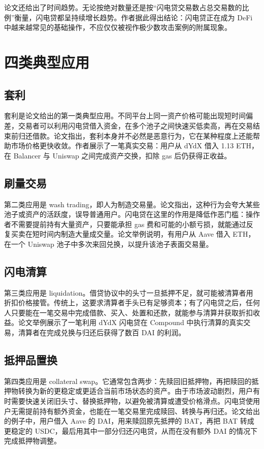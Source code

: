 \documentclass[UTF8,11pt]{ctexart}
\begin{document}
论文还给出了时间趋势。无论按绝对数量还是按“闪电贷交易数占总交易数的比例”衡量，闪电贷都呈持续增长趋势。作者据此得出结论：闪电贷正在成为 DeFi 中越来越常见的基础操作，不应仅仅被视作极少数攻击案例的附属现象。

\section{四类典型应用}
\subsection{套利}
套利是论文给出的第一类典型应用。不同平台上同一资产价格可能出现短时间偏差，交易者可以利用闪电贷借入资金，在多个池子之间快速买低卖高，再在交易结束前归还借款。论文指出，套利本身并不必然是恶意行为，它在某种程度上还能帮助市场价格更快收敛。作者展示了一笔真实交易：用户从 dYdX 借入 1.13 ETH，在 Balancer 与 Uniswap 之间完成资产交换，扣除 gas 后仍获得正收益。

\subsection{刷量交易}
第二类应用是 wash trading，即人为制造交易量。论文指出，这种行为会夸大某些池子或资产的活跃度，误导普通用户。闪电贷在这里的作用是降低作恶门槛：操作者不需要提前持有大量资产，只要能承担 gas 费和可能的小额亏损，就能通过反复买卖在短时间内制造大量成交量。论文举例说明，有用户从 Aave 借入 ETH，在一个 Uniswap 池子中多次来回兑换，以提升该池子表面交易量。

\subsection{闪电清算}
第三类应用是 liquidation。借贷协议中的头寸一旦抵押不足，就可能被清算者用折扣价格接管。传统上，这要求清算者手头已有足够资本；有了闪电贷之后，任何人只要能在一笔交易中完成借款、买入、处置和还款，就能参与清算并获取折扣收益。论文举例展示了一笔利用 dYdX 闪电贷在 Compound 中执行清算的真实交易，清算者在完成兑换与归还后获得了数百 DAI 的利润。

\subsection{抵押品置换}
第四类应用是 collateral swap。它通常包含两步：先赎回旧抵押物，再把赎回的抵押物转换为新的更稳定或更适合当前市场状态的资产。由于市场波动剧烈，用户有时需要快速关闭旧头寸、替换抵押物，以避免被清算或遭受价格滑点。闪电贷使用户无需提前持有额外资金，也能在一笔交易里完成赎回、转换与再归还。论文给出的例子中，用户借入 Aave 的 DAI，用来赎回原先抵押的 BAT，再把 BAT 转成更稳定的 USDC，最后用其中一部分归还闪电贷，从而在没有额外 DAI 的情况下完成抵押物调整。
\end{document}

